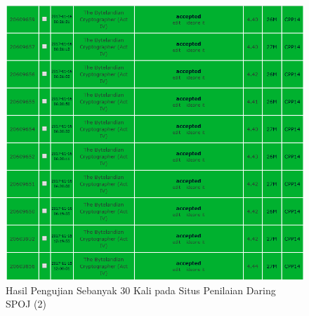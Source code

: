   \begin{figure}[H]
  \centering
  	\includegraphics[scale=0.5]{images/lampiran/uji3.png}
  	\caption{Hasil Pengujian Sebanyak 30 Kali pada Situs Penilaian Daring SPOJ (2)}
  	\label{fig:submission2}
  \end{figure}
  
 
  
  
